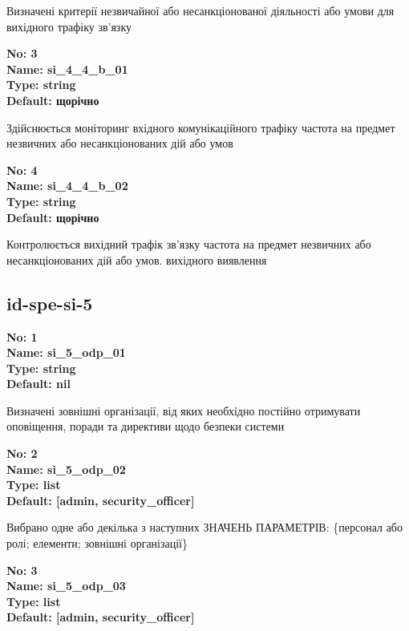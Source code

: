 \documentclass{article}
\begin{document}
{\footnotesize Визначені критерії незвичайної або несанкціонованої діяльності або умови для вихідного трафіку зв'язку}


{\footnotesize\bfseries
No: 3\\
Name: si\_\allowbreak{}4\_\allowbreak{}4\_\allowbreak{}b\_\allowbreak{}01\\
Type: string\\
Default: \textquotedbl{}щорічно\textquotedbl{}
}

{\footnotesize Здійснюється моніторинг вхідного комунікаційного трафіку частота на предмет незвичних або несанкціонованих дій або умов}


{\footnotesize\bfseries
No: 4\\
Name: si\_\allowbreak{}4\_\allowbreak{}4\_\allowbreak{}b\_\allowbreak{}02\\
Type: string\\
Default: \textquotedbl{}щорічно\textquotedbl{}
}

{\footnotesize Контролюється вихідний трафік зв'язку частота на предмет незвичних або несанкціонованих дій або умов. вихідного виявлення}




\subsection{id-spe-si-5}


\vspace{10pt}
{\footnotesize\bfseries
No: 1\\
Name: si\_\allowbreak{}5\_\allowbreak{}odp\_\allowbreak{}01\\
Type: string\\
Default: nil
}

{\footnotesize Визначені зовнішні організації, від яких необхідно постійно отримувати оповіщення, поради та директиви щодо безпеки системи}


{\footnotesize\bfseries
No: 2\\
Name: si\_\allowbreak{}5\_\allowbreak{}odp\_\allowbreak{}02\\
Type: list\\
Default: [\textquotedbl{}admin\textquotedbl{}, \textquotedbl{}security\_\allowbreak{}officer\textquotedbl{}]
}

{\footnotesize Вибрано одне або декілька з наступних ЗНАЧЕНЬ ПАРАМЕТРІВ: \{персонал або ролі; елементи; зовнішні організації\}}


{\footnotesize\bfseries
No: 3\\
Name: si\_\allowbreak{}5\_\allowbreak{}odp\_\allowbreak{}03\\
Type: list\\
Default: [\textquotedbl{}admin\textquotedbl{}, \textquotedbl{}security\_\allowbreak{}officer\textquotedbl{}]
}
\end{document}
